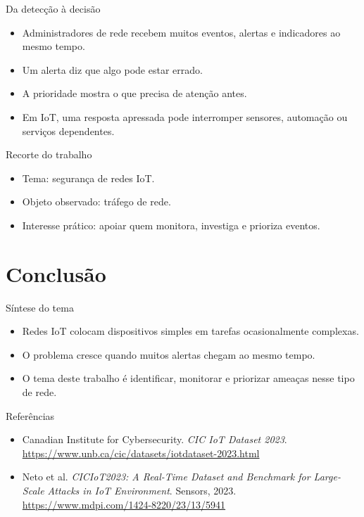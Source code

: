 \documentclass[aspectratio=169]{beamer}
\begin{document}
\begin{frame}{Da detecção à decisão}
    \begin{itemize}
        \item Administradores de rede recebem muitos eventos, alertas e indicadores ao mesmo tempo.
        \item Um alerta diz que algo pode estar errado.
        \item A prioridade mostra o que precisa de atenção antes.
        \item Em IoT, uma resposta apressada pode interromper sensores, automação ou serviços dependentes.
    \end{itemize}
\end{frame}

\begin{frame}{Recorte do trabalho}
    \begin{itemize}
        \item Tema: segurança de redes IoT.
        \item Objeto observado: tráfego de rede.
        \item Interesse prático: apoiar quem monitora, investiga e prioriza eventos.
    \end{itemize}
\end{frame}

\section{Conclusão}

\begin{frame}{Síntese do tema}
    \begin{itemize}
        \item Redes IoT colocam dispositivos simples em tarefas ocasionalmente complexas.
        \item O problema cresce quando muitos alertas chegam ao mesmo tempo.
        \item O tema deste trabalho é identificar, monitorar e priorizar ameaças nesse tipo de rede.
    \end{itemize}
\end{frame}

\begin{frame}{Referências}
    \footnotesize
    \begin{itemize}
        \item Canadian Institute for Cybersecurity. \textit{CIC IoT Dataset 2023}. \url{https://www.unb.ca/cic/datasets/iotdataset-2023.html}
        \item Neto et al. \textit{CICIoT2023: A Real-Time Dataset and Benchmark for Large-Scale Attacks in IoT Environment}. Sensors, 2023. \url{https://www.mdpi.com/1424-8220/23/13/5941}
    \end{itemize}
\end{frame}
\end{document}
